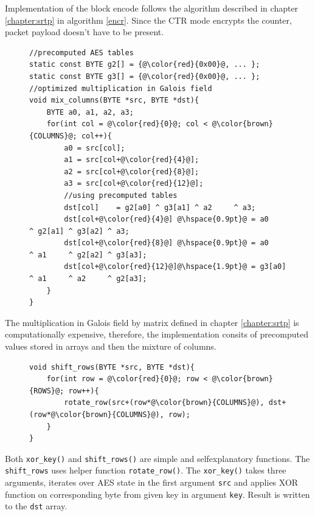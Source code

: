 Implementation of the block encode follows the algorithm described in chapter
\ref{chapter:srtp} in algorithm \ref{encr}. Since the CTR mode encrypts the
counter, packet payload doesn't have to be present. 

\begin{figure}[H]
\begin{lstlisting}
//precomputed AES tables
static const BYTE g2[] = {@\color{red}{0x00}@, ... };
static const BYTE g3[] = {@\color{red}{0x00}@, ... };
//optimized multiplication in Galois field
void mix_columns(BYTE *src, BYTE *dst){
    BYTE a0, a1, a2, a3;
    for(int col = @\color{red}{0}@; col < @\color{brown}{COLUMNS}@; col++){ 
        a0 = src[col]; 
        a1 = src[col+@\color{red}{4}@];
        a2 = src[col+@\color{red}{8}@];
        a3 = src[col+@\color{red}{12}@];
        //using precomputed tables
        dst[col]    = g2[a0] ^ g3[a1] ^ a2     ^ a3;
        dst[col+@\color{red}{4}@] @\hspace{0.9pt}@ = a0     ^ g2[a1] ^ g3[a2] ^ a3;
        dst[col+@\color{red}{8}@] @\hspace{0.9pt}@ = a0     ^ a1     ^ g2[a2] ^ g3[a3];
        dst[col+@\color{red}{12}@]@\hspace{1.9pt}@ = g3[a0] ^ a1     ^ a2     ^ g2[a3];
    }
}
\end{lstlisting}
\end{figure}
The multiplication in Galois field by matrix defined in chapter 
\ref{chapter:srtp} is computationally expensive, therefore, the implementation
consits of precomputed values stored in arrays and then the mixture of columns.

\begin{figure}[H]
\begin{lstlisting}
void shift_rows(BYTE *src, BYTE *dst){   
    for(int row = @\color{red}{0}@; row < @\color{brown}{ROWS}@; row++){
        rotate_row(src+(row*@\color{brown}{COLUMNS}@), dst+(row*@\color{brown}{COLUMNS}@), row);
    }
}
\end{lstlisting}
\end{figure}

Both \texttt{xor\_key()} and \texttt{shift\_rows()} are simple and selfexplanatory
functions. The \texttt{shift\_rows} uses helper function \texttt{rotate\_row()}.
The \texttt{xor\_key()} takes three arguments, iterates over AES state in the
first argument \texttt{src} and applies XOR function on corresponding byte from 
given key in argument \texttt{key}. Result is written to the \texttt{dst} array. 


